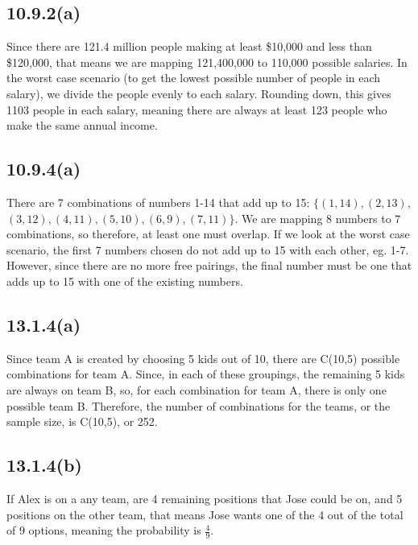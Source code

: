 \documentclass{article}
\begin{document}
\subsection*{10.9.2(a)}
Since there are 121.4 million people making at least \$10,000 and less than \$120,000, that means we are mapping 121,400,000 to 110,000 possible salaries. In the worst case scenario (to get the lowest possible number of people in each salary), we divide the people evenly to each salary. Rounding down, this gives 1103 people in each salary, meaning there are always at least 123 people who make the same annual income.
\subsection*{10.9.4(a)}
There are 7 combinations of numbers 1-14 that add up to 15: $\{(1,14),(2,13),$ $(3,12),(4,11),(5,10),(6,9),(7,11)\}$. We are mapping 8 numbers to 7 combinations, so therefore, at least one must overlap. If we look at the worst case scenario, the first 7 numbers chosen do not add up to 15 with each other, eg. 1-7. However, since there are no more free pairings, the final number must be one that adds up to 15 with one of the existing numbers.
\subsection*{13.1.4(a)}
Since team A is created by choosing 5 kids out of 10, there are C(10,5) possible combinations for team A. Since, in each of these groupings, the remaining 5 kids are always on team B, so, for each combination for team A, there is only one possible team B. Therefore, the number of combinations for the teams, or the sample size, is C(10,5), or 252.
\subsection*{13.1.4(b)}
If Alex is on a any team, are 4 remaining positions that Jose could be on, and 5 positions on the other team, that means Jose wants one of the 4 out of the total of 9 options, meaning the probability is $\frac{4}{9}$.
\clearpage
\end{document}

